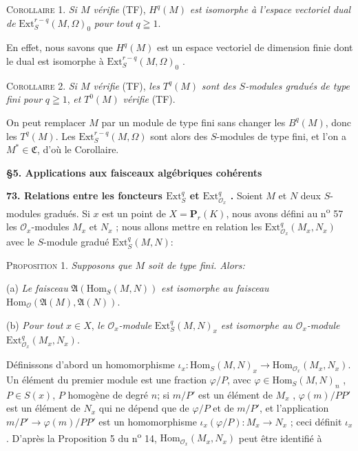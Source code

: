 \textsc{Corollaire} 1. \textit{Si $M$ vérifie} (TF), $H^q(M)$ \textit{est isomorphe à l'espace vectoriel dual de} $\mathrm{Ext}_S^{r-q}(M, \Omega)_0$ \textit{pour tout} $q \geqq 1$.

En effet, nous savons que $H^q(M)$ est un espace vectoriel de dimension finie dont le dual est isomorphe à $\mathrm{Ext}_S^{r-q}(M, \Omega)_0$ .

\textsc{Corollaire} 2. \textit{Si $M$ vérifie} (TF), \textit{les} $T^q(M)$ \textit{sont des $S$-modules gradués de type fini pour} $q \geqq 1$, \textit{et} $T^0(M)$ \textit{vérifie} (TF).

On peut remplacer $M$ par un module de type fini sans changer les $B^q(M)$, donc les $T^q(M)$. Les $\mathrm{Ext}_S^{r-q}(M, \Omega)$ sont alors des $S$-modules de type fini, et l'on a $M^* \in \mathfrak{C}$, d'où le Corollaire.

\begin{center}
\textbf{\S5. Applications aux faisceaux algébriques cohérents}
\end{center}

\textbf{73. Relations entre les foncteurs $\mathrm{Ext}_S^q$ et $\mathrm{Ext}_{\mathcal{O}_x}^q$ .} Soient $M$ et $N$ deux $S$-modules gradués. Si $x$ est un point de $X = \mathbf{P}_r(K)$, nous avons défini au n\textsuperscript{o} 57 les $\mathcal{O}_x$-modules $M_x$ et $N_x$ ; nous allons mettre en relation les $\mathrm{Ext}_{\mathcal{O}_x}^q(M_x , N_x)$ avec le $S$-module gradué $\mathrm{Ext}_S^q(M, N)$:

\textsc{Proposition} 1. \textit{Supposons que $M$ soit de type fini. Alors:}

(a) \textit{Le faisceau} $\mathfrak{A}(\mathrm{Hom}_S(M, N))$ \textit{est isomorphe au faisceau} $\mathrm{Hom}_{\mathcal{O}}(\mathfrak{A}(M), \mathfrak{A}(N))$.

(b) \textit{Pour tout} $x \in X$, \textit{le $\mathcal{O}_x$-module} $\mathrm{Ext}_S^q(M, N)_x$ \textit{est isomorphe au $\mathcal{O}_x$-module} $\mathrm{Ext}_{\mathcal{O}_x}^q(M_x , N_x)$.

Définissons d'abord un homomorphisme $\iota_x: \mathrm{Hom}_S(M, N)_x \rightarrow \mathrm{Hom}_{\mathcal{O}_x}(M_x , N_x)$. Un élément du premier module est une fraction $\varphi/P$, avec $\varphi \in \mathrm{Hom}_S(M, N)_n$ , $P \in S(x)$, $P$ homogène de degré $n$; si $m/P'$ est un élément de $M_x$ , $\varphi(m)/PP'$ est un élément de $N_x$ qui ne dépend que de $\varphi/P$ et de $m/P'$, et l'application $m/P' \rightarrow \varphi(m)/PP'$ est un homomorphisme $\iota_x(\varphi/P): M_x \rightarrow N_x$ ; ceci définit $\iota_x$ . D'après la Proposition 5 du n\textsuperscript{o} 14, $\mathrm{Hom}_{\mathcal{O}_x}(M_x , N_x)$ peut être identifié à

